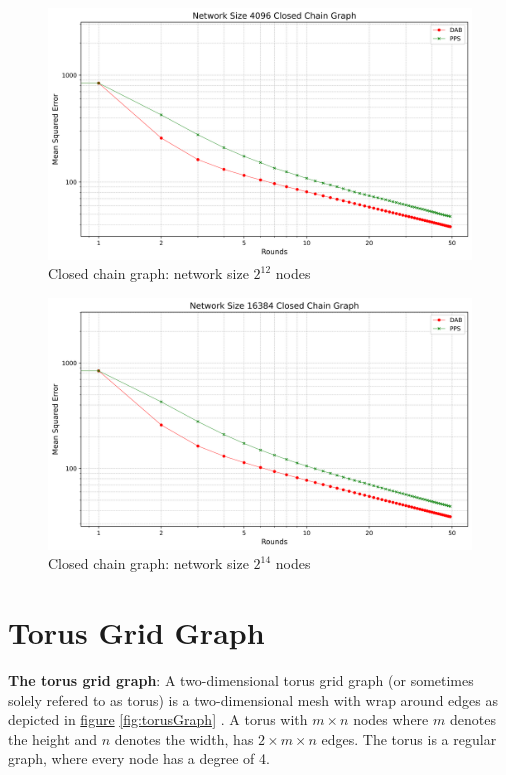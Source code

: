 \begin{figure}[H]
    \centering
    \includegraphics[scale=0.5]{figures/closedChainSimulations/DAB_vs_PPS_CCG_r50_n4096.png}
    \caption{Closed chain graph: network size $2^{12}$ nodes}
    \label{fig:4096ChainGraph}
\end{figure}

\begin{figure}[H]
    \centering
    \includegraphics[scale=0.5]{figures/closedChainSimulations/DAB_vs_PPS_CCG_r50_n16384.png}
    \caption{Closed chain graph: network size $2^{14}$ nodes}
    \label{fig:16384ChainGraph}
\end{figure}

\section{Torus Grid Graph}
\textbf{The torus grid graph}: A two-dimensional torus grid graph (or sometimes solely refered to as torus) is a two-dimensional mesh with wrap around edges as depicted in \hyperref[fig:torusGraph]{figure} \ref{fig:torusGraph} \cite{Mahlmann2010}. A torus with $m \times n$ nodes where $m$ denotes the height and $n$ denotes the width, has $2\times m \times n$ edges. The torus is a regular graph, where every node has a degree of 4.

